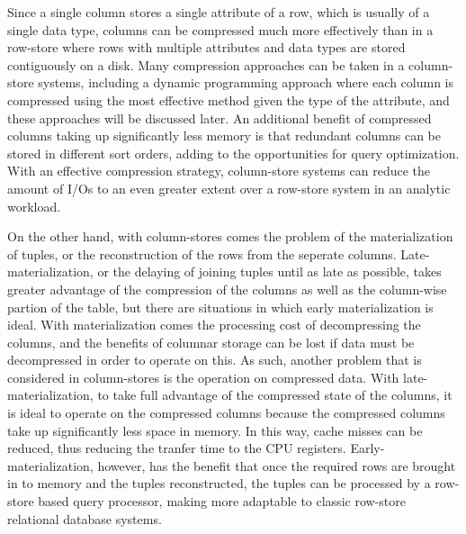 Since a single column stores a single attribute of a row, which is usually of a single data type, columns can be compressed much more effectively than in a row-store where rows with multiple attributes and data types are stored contiguously on a disk. Many compression approaches can be taken in a column-store systems, including a dynamic programming approach where each column is compressed using the most effective method given the type of the attribute, and these approaches will be discussed later. An additional benefit of compressed columns taking up significantly less memory is that redundant columns can be stored in different sort orders, adding to the opportunities for query optimization\cite{now}. With an effective compression strategy, column-store systems can reduce the amount of I/Os to an even greater extent over a row-store system in an analytic workload.


On the other hand, with column-stores comes the problem of the materialization of tuples, or the reconstruction of the rows from the seperate columns\cite{now}. Late-materialization, or the delaying of joining tuples until as late as possible, takes greater advantage of the compression of the columns as well as the column-wise partion of the table, but there are situations in which early materialization is ideal. With materialization comes the processing cost of decompressing the columns, and the benefits of columnar storage can be lost if data must be decompressed in order to operate on this. As such, another problem that is considered in column-stores is the operation on compressed data\cite{now}. With late-materialization, to take full advantage of the compressed state of the columns, it is ideal to operate on the compressed columns because the compressed columns take up significantly less space in memory. In this way, cache misses can be reduced, thus reducing the tranfer time to the CPU registers\cite{slides}. Early-materialization, however, has the benefit that once the required rows are brought in to memory and the tuples reconstructed, the tuples can be processed by a row-store based query processor, making more adaptable to classic row-store relational database systems.









